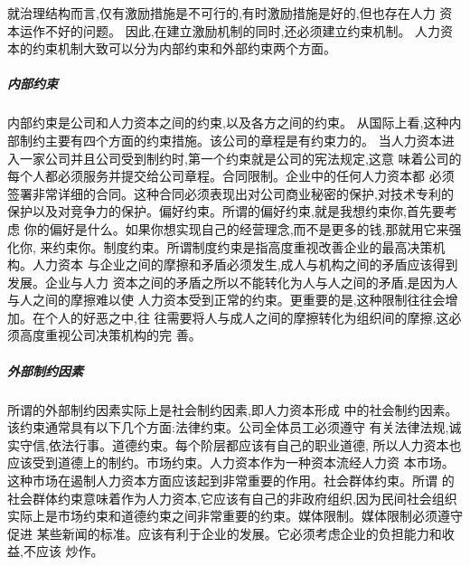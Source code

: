 就治理结构而言,仅有激励措施是不可行的,有时激励措施是好的,但也存在人力
资本运作不好的问题。 因此,在建立激励机制的同时,还必须建立约束机制。 人力资
本的约束机制大致可以分为内部约束和外部约束两个方面。
\subparagraph{ 内部约束 }
内部约束是公司和人力资本之间的约束,以及各方之间的约束。
从国际上看,这种内部制约主要有四个方面的约束措施。该公司的章程是有约束力的。
当人力资本进入一家公司并且公司受到制约时,第一个约束就是公司的宪法规定,这意
味着公司的每个人都必须服务并提交给公司章程。合同限制。企业中的任何人力资本都
必须签署非常详细的合同。这种合同必须表现出对公司商业秘密的保护,对技术专利的
保护以及对竞争力的保护。偏好约束。所谓的偏好约束,就是我想约束你,首先要考虑
你的偏好是什么。如果你想实现自己的经营理念,而不是更多的钱,那就用它来强化你,
来约束你。制度约束。所谓制度约束是指高度重视改善企业的最高决策机构。人力资本
与企业之间的摩擦和矛盾必须发生,成人与机构之间的矛盾应该得到发展。企业与人力
资本之间的矛盾之所以不能转化为人与人之间的矛盾,是因为人与人之间的摩擦难以使
人力资本受到正常的约束。更重要的是,这种限制往往会增加。在个人的好恶之中,往
往需要将人与成人之间的摩擦转化为组织间的摩擦,这必须高度重视公司决策机构的完
善。
\subparagraph{ 外部制约因素 }
所谓的外部制约因素实际上是社会制约因素,即人力资本形成
中的社会制约因素。该约束通常具有以下几个方面:法律约束。公司全体员工必须遵守
有关法律法规,诚实守信,依法行事。道德约束。每个阶层都应该有自己的职业道德,
所以人力资本也应该受到道德上的制约。市场约束。人力资本作为一种资本流经人力资
本市场。这种市场在遏制人力资本方面应该起到非常重要的作用。社会群体约束。所谓
的社会群体约束意味着作为人力资本,它应该有自己的非政府组织,因为民间社会组织
实际上是市场约束和道德约束之间非常重要的约束。媒体限制。媒体限制必须遵守促进
某些新闻的标准。应该有利于企业的发展。它必须考虑企业的负担能力和收益,不应该
炒作。
